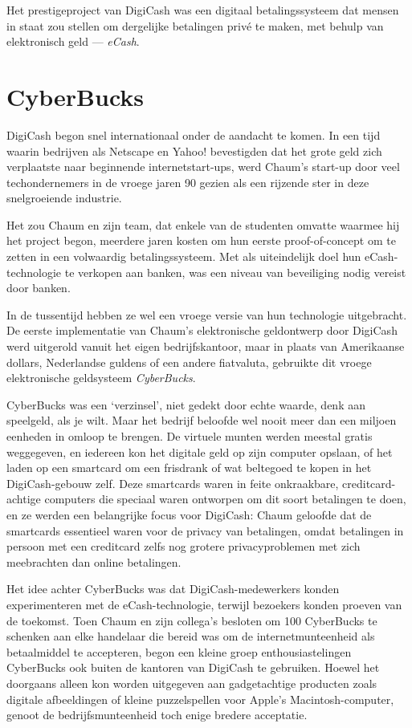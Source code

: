 \documentclass[smalldemyvopaper,11pt,twoside,onecolumn,openright,extrafontsizes,hidelinks]{memoir}
\begin{document}
Het prestigeproject van DigiCash was een digitaal betalingssysteem dat
mensen in staat zou stellen om dergelijke betalingen privé te maken, met
behulp van elektronisch geld --- \emph{eCash}.

\section{CyberBucks}\label{cyberbucks}

DigiCash begon snel internationaal onder de aandacht te komen. In een
tijd waarin bedrijven als Netscape en Yahoo! bevestigden dat het grote
geld zich verplaatste naar beginnende internetstart-ups, werd Chaum's
start-up door veel techondernemers in de vroege jaren 90 gezien als een
rijzende ster in deze snelgroeiende industrie.

Het zou Chaum en zijn team, dat enkele van de studenten omvatte waarmee
hij het project begon, meerdere jaren kosten om hun eerste
proof-of-concept om te zetten in een volwaardig betalingssysteem. Met
als uiteindelijk doel hun eCash-technologie te verkopen aan banken, was
een niveau van beveiliging nodig vereist door banken.

In de tussentijd hebben ze wel een vroege versie van hun technologie
uitgebracht. De eerste implementatie van Chaum's elektronische
geldontwerp door DigiCash werd uitgerold vanuit het eigen
bedrijfskantoor, maar in plaats van Amerikaanse dollars, Nederlandse
guldens of een andere fiatvaluta, gebruikte dit vroege elektronische
geldsysteem \emph{CyberBucks}.

CyberBucks was een `verzinsel', niet gedekt door echte waarde, denk aan
speelgeld, als je wilt. Maar het bedrijf beloofde wel nooit meer dan een
miljoen eenheden in omloop te brengen. De virtuele munten werden meestal
gratis weggegeven, en iedereen kon het digitale geld op zijn computer
opslaan, of het laden op een smartcard om een frisdrank of wat beltegoed
te kopen in het DigiCash-gebouw zelf. Deze smartcards waren in feite
onkraakbare, creditcard-achtige computers die speciaal waren ontworpen
om dit soort betalingen te doen, en ze werden een belangrijke focus voor
DigiCash: Chaum geloofde dat de smartcards essentieel waren voor de
privacy van betalingen, omdat betalingen in persoon met een creditcard
zelfs nog grotere privacyproblemen met zich meebrachten dan online
betalingen.

Het idee achter CyberBucks was dat DigiCash-medewerkers konden
experimenteren met de eCash-technologie, terwijl bezoekers konden
proeven van de toekomst. Toen Chaum en zijn collega's besloten om 100
CyberBucks te schenken aan elke handelaar die bereid was om de
internetmunteenheid als betaalmiddel te accepteren, begon een kleine
groep enthousiastelingen CyberBucks ook buiten de kantoren van DigiCash
te gebruiken. Hoewel het doorgaans alleen kon worden uitgegeven aan
gadgetachtige producten zoals digitale afbeeldingen of kleine
puzzelspellen voor Apple's Macintosh-computer, genoot de
bedrijfsmunteenheid toch enige bredere acceptatie.
\end{document}
